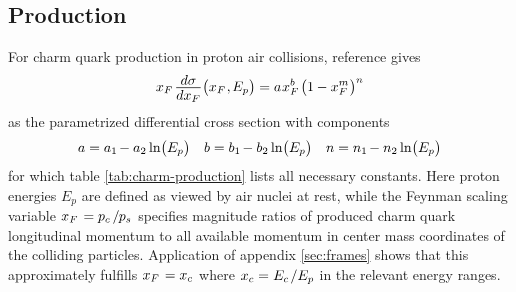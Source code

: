 \subsection*{Production}

For charm quark production in proton air collisions, reference \cite{Goncalves_2007} gives
\begin{equation*}
	x_F \kern+1.0pt \frac{\raisebox{-0.5ex}{$d\sigma$}}{\raisebox{0.5ex}{$dx_F$}} \bigl( x_F \kern+0.5pt, \kern-0.5pt E_p \bigr)
	= a \kern+0.5pt x_F^b \kern+1.0pt \bigl( 1 \kern-0.3pt - x_F^m \kern+0.3pt \bigr)^n
\end{equation*}
as the parametrized differential cross section with components
\begin{align*}
	a = a_1 \kern-1.0pt - a_2 \ln\bigl(E_p\bigr) && b = b_1 \kern-1.0pt - b_2 \ln\bigl(E_p\bigr) &&
	n = n_1 \kern-1.0pt - n_2 \ln\bigl(E_p\bigr)
\end{align*}
for which table \ref{tab:charm-production} lists all necessary constants. Here proton energies $E_p$ are defined as viewed
by air nuclei at rest, while the Feynman scaling variable $x_F \kern+1.0pt = p_c \kern+1.5pt / \kern-0.5pt p_s$ specifies
magnitude ratios of produced charm quark longitudinal momentum to all available momentum in center mass coordinates of the
colliding particles. Application of appendix \ref{sec:frames} shows that this approximately fulfills $x_F \kern+1.0pt = x_c$
where $x_c = \kern+0.2pt E_c \kern+1.0pt / E_p$ in the relevant energy ranges.



